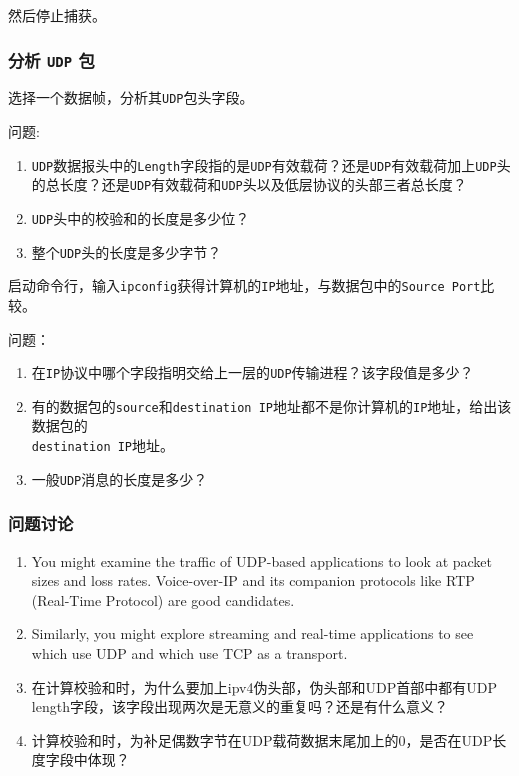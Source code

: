 \documentclass{article}
\begin{document}
然后停止捕获。

\subsubsection{分析 \texttt{UDP} 包}
选择一个数据帧，分析其\texttt{UDP}包头字段。


问题:
\begin{enumerate}[label={\arabic*})]
  \item \texttt{UDP}数据报头中的\texttt{Length}字段指的是\texttt{UDP}有效载荷？还是\texttt{UDP}有效载荷加上\texttt{UDP}头的总长度？还是\texttt{UDP}有效载荷和\texttt{UDP}头以及低层协议的头部三者总长度？
  \item \texttt{UDP}头中的校验和的长度是多少位？
  \item 整个\texttt{UDP}头的长度是多少字节？
\end{enumerate}

启动命令行，输入\texttt{ipconfig}获得计算机的\texttt{IP}地址，与数据包中的\texttt{Source Port}比较。

问题：
\begin{enumerate}[label={\arabic*})]
  \item 在\texttt{IP}协议中哪个字段指明交给上一层的\texttt{UDP}传输进程？该字段值是多少？

  \item 有的数据包的\texttt{source}和\texttt{destination IP}地址都不是你计算机的\texttt{IP}地址，给出该数据包的 \\ \texttt{destination IP}地址。

  \item 一般\texttt{UDP}消息的长度是多少？
\end{enumerate}



\subsubsection{问题讨论}


\begin{enumerate}[noitemsep]
  \item You might examine the traffic of UDP-based applications to look at packet sizes and loss rates. Voice-over-IP and its companion protocols like RTP (Real-Time Protocol) are good candidates.

  \item Similarly, you might explore streaming and real-time applications to see which use UDP and which use TCP as a transport.

  \item 在计算校验和时，为什么要加上ipv4伪头部，伪头部和UDP首部中都有UDP length字段，该字段出现两次是无意义的重复吗？还是有什么意义？

  \item 计算校验和时，为补足偶数字节在UDP载荷数据末尾加上的0，是否在UDP长度字段中体现？

\end{enumerate}
\end{document}
